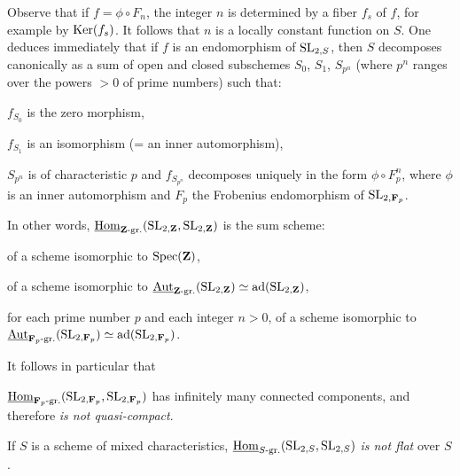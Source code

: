 Observe that if $f=\phi\circ F_n$, the integer $n$ is determined by a fiber $f_s$ of $f$, for example by $\operatorname{Ker}(f_s)$. It follows that $n$ is a locally constant function on $S$.
\label{XXIV.7.4.6}
One deduces immediately that if $f$ is an endomorphism of $\operatorname{SL}_{2,S}$, then $S$ decomposes canonically as a sum of open and closed subschemes $S_0$, $S_1$, $S_{p^n}$ (where $p^n$ ranges over the powers $>0$ of prime numbers) such that:
\begin{enumeratei}
\item $f_{S_0}$ is the zero morphism,
\item $f_{S_1}$ is an isomorphism (= an inner automorphism),
\item $S_{p^n}$ is of characteristic $p$ and $f_{S_{p^n}}$ decomposes uniquely in the form $\phi\circ F_p^n$, where $\phi$ is an inner automorphism and $F_p$ the Frobenius endomorphism of $\operatorname{SL}_{2,\mathbf{F}_p}$.
\end{enumeratei}
\label{XXIV.7.4.7}
In other words, $\underline{\operatorname{Hom}}_{\mathbf{Z}\text{-gr.}}(\operatorname{SL}_{2,\mathbf{Z}},\operatorname{SL}_{2,\mathbf{Z}})$ is the sum scheme:
\begin{enumeratei}
\item of a scheme isomorphic to $\operatorname{Spec}(\mathbf{Z})$,
\item of a scheme isomorphic to $\underline{\operatorname{Aut}}_{\mathbf{Z}\text{-gr.}}(\operatorname{SL}_{2,\mathbf{Z}})\simeq\operatorname{ad}(\operatorname{SL}_{2,\mathbf{Z}})$,
\item for each prime number $p$ and each integer $n>0$, of a scheme isomorphic to $\underline{\operatorname{Aut}}_{\mathbf{F}_p\text{-gr.}}(\operatorname{SL}_{2,\mathbf{F}_p})\simeq\operatorname{ad}(\operatorname{SL}_{2,\mathbf{F}_p})$.
\end{enumeratei}
\label{XXIV.7.4.8}
It follows in particular that
\begin{enumeratei}
\item $\underline{\operatorname{Hom}}_{\mathbf{F}_p\text{-gr.}}(\operatorname{SL}_{2,\mathbf{F}_p},\operatorname{SL}_{2,\mathbf{F}_p})$ has infinitely many connected components, and therefore \emph{is not quasi-compact}.
\item If $S$ is a scheme of mixed characteristics, $\underline{\operatorname{Hom}}_{S\text{-gr.}}(\operatorname{SL}_{2,S},\operatorname{SL}_{2,S})$ \emph{is not flat} over $S$.
\end{enumeratei}

